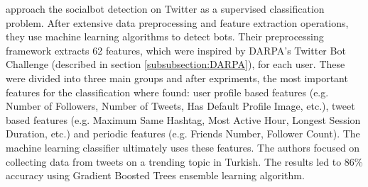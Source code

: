     \textcite[630-634]{PreprocessingFrameworkTwitter} approach the socialbot detection on Twitter as a supervised classification problem. After extensive data preprocessing and feature extraction operations, they use machine learning algorithms to detect bots. Their preprocessing framework extracts 62 features, which were inspired by DARPA's Twitter Bot Challenge (described in section \ref{subsubsection:DARPA}), for each user. These were divided into three main groups and after expriments, the most important features for the classification where found: user profile based features (e.g. Number of Followers, Number of Tweets, Has Default Profile Image, etc.), tweet based features (e.g. Maximum Same Hashtag, Most Active Hour, Longest Session Duration, etc.) and periodic features (e.g. Friends Number, Follower Count). The machine learning classifier ultimately uses these features. The authors focused on collecting data from tweets on a trending topic in Turkish. The results led to 86\% accuracy using Gradient Boosted Trees ensemble learning algorithm.
    
    
